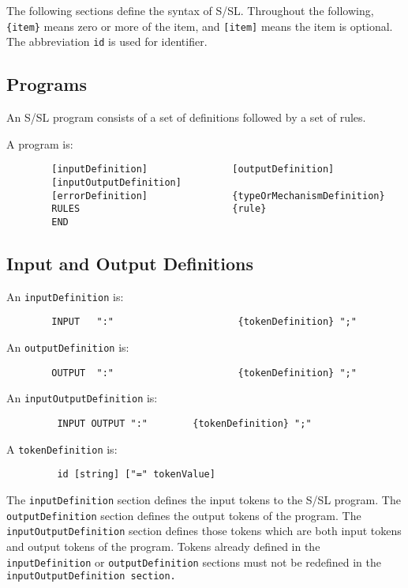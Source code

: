 The      following  sections  define  the  syntax  of  S/SL.
Throughout the following, {\tt \{item\}} means zero or more  of the
item,  and {\tt [item]} means the item is optional.  The abbreviation 
{\tt id} is used for identifier.


\subsection{Programs}

An S/SL program consists of a set of definitions followed
by a set of rules.

A program is:
\begin{verbatim}
        [inputDefinition]               [outputDefinition]
        [inputOutputDefinition]
        [errorDefinition]               {typeOrMechanismDefinition}
        RULES                           {rule}             
        END
\end{verbatim}


\subsection{Input and Output Definitions}

An {\tt inputDefinition} is:
\begin{verbatim}
        INPUT   ":"                      {tokenDefinition} ";"
\end{verbatim}

An {\tt outputDefinition} is:
\begin{verbatim}
        OUTPUT  ":"                      {tokenDefinition} ";"
\end{verbatim}


An {\tt inputOutputDefinition} is:
\begin{verbatim}
         INPUT OUTPUT ":"        {tokenDefinition} ";"
\end{verbatim}


A {\tt tokenDefinition} is:
\begin{verbatim}
         id [string] ["=" tokenValue]
\end{verbatim}


The {\tt inputDefinition} section defines the input  tokens  to
the  S/SL program.  The {\tt outputDefinition} section defines the
output tokens of  the  program.   The  {\tt inputOutputDefinition}
section defines those tokens which are both input tokens and
output tokens of the program.  Tokens already defined in the
{\tt inputDefinition} or  {\tt outputDefinition} sections
must not be
redefined in the {\tt inputOutputDefinition section.}

